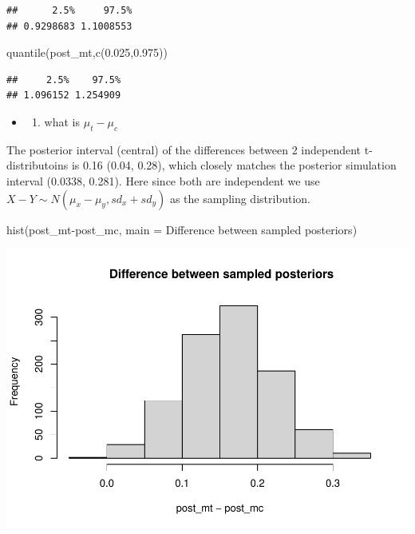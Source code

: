 \documentclass[
]{book}
\newenvironment{Shaded}{\begin{snugshade}}{\end{snugshade}}
\newcommand{\AttributeTok}[1]{\textcolor[rgb]{0.77,0.63,0.00}{#1}}
\newcommand{\FloatTok}[1]{\textcolor[rgb]{0.00,0.00,0.81}{#1}}
\newcommand{\FunctionTok}[1]{\textcolor[rgb]{0.00,0.00,0.00}{#1}}
\newcommand{\NormalTok}[1]{#1}
\newcommand{\SpecialCharTok}[1]{\textcolor[rgb]{0.00,0.00,0.00}{#1}}
\newcommand{\StringTok}[1]{\textcolor[rgb]{0.31,0.60,0.02}{#1}}
\providecommand{\tightlist}{%
  \setlength{\itemsep}{0pt}\setlength{\parskip}{0pt}}
\theoremstyle{definition}
\theoremstyle{definition}
\theoremstyle{definition}
\theoremstyle{definition}
\theoremstyle{remark}
\begin{document}
\begin{verbatim}
##      2.5%     97.5% 
## 0.9298683 1.1008553
\end{verbatim}

\begin{Shaded}
\begin{Highlighting}[]
        \FunctionTok{quantile}\NormalTok{(post\_mt,}\FunctionTok{c}\NormalTok{(}\FloatTok{0.025}\NormalTok{,}\FloatTok{0.975}\NormalTok{))}
\end{Highlighting}
\end{Shaded}

\begin{verbatim}
##     2.5%    97.5% 
## 1.096152 1.254909
\end{verbatim}

\begin{itemize}
\item
  \begin{enumerate}
  \def\labelenumi{(\alph{enumi})}
  \setcounter{enumi}{1}
  \tightlist
  \item
    what is \(\mu_t - \mu_c\)
  \end{enumerate}
\end{itemize}

The posterior interval (central) of the differences between 2 independent t-distributoins is 0.16 (0.04, 0.28), which closely matches the posterior simulation interval (0.0338, 0.281). Here since both are independent we use \(X-Y\sim N(\mu_x-\mu_y, sd_x+sd_y)\) as the sampling distribution.

\begin{Shaded}
\begin{Highlighting}[]
 \FunctionTok{hist}\NormalTok{(post\_mt}\SpecialCharTok{{-}}\NormalTok{post\_mc, }\AttributeTok{main =} \StringTok{\textquotesingle{} Difference between sampled posteriors\textquotesingle{}}\NormalTok{)}
\end{Highlighting}
\end{Shaded}

\includegraphics{_main_files/figure-latex/unnamed-chunk-32-1.pdf}
\end{document}
